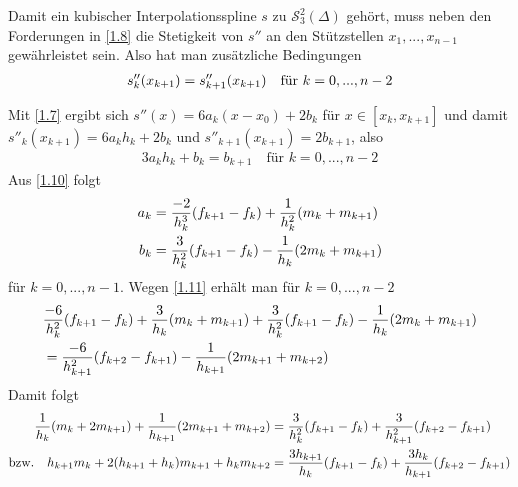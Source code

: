 Damit ein kubischer Interpolationsspline $s$ zu $\mathcal{S}^2_3(\Delta)$ gehört, muss neben den Forderungen in \cref{1.8} die Stetigkeit von $s''$ an den Stützstellen $x_1,...,x_{n-1}$ gewährleistet sein. Also hat man zusätzliche Bedingungen
\begin{align}
	s''_k(x_{k+1})=s''_{k+1}(x_{k+1})\quad\text{für } k=0,...,n-2\notag
\end{align}
\begin{center}
\end{center}
Mit \cref{1.7} ergibt sich $s''(x)=6a_k(x-x_0)+2b_k$ für $x\in[x_k,x_{k+1}]$ und damit $s''_k(x_{k+1}) = 6a_kh_k+2b_k$ und $s''_{k+1}(x_{k+1})=2b_{k+1}$, also 
\begin{align}
	\label{1.11}
	3a_kh_k+b_k=b_{k+1}\quad\text{für }k=0,...,n-2
\end{align}
Aus \cref{1.10} folgt
\begin{align}
	a_k &= \frac{-2}{h_k^3}(f_{k+1}-f_k)+\frac{1}{h_k^2}(m_k+m_{k+1}) \notag \\
	b_k &= \frac{3}{h_k^2}(f_{k+1}-f_k)-\frac{1}{h_k}(2m_k+m_{k+1})\notag
\end{align}
für $k=0,...,n-1$. Wegen \cref{1.11} erhält man für $k=0,...,n-2$
\begin{align}
	& \frac{-6}{h_k^2}(f_{k+1}-f_k) + \frac{3}{h_k}(m_k+m_{k+1}) + \frac{3}{h_k^2}(f_{k+1}-f_k) - \frac{1}{h_k}(2m_k+m_{k+1}) \notag \\
	&= \frac{-6}{h^2_{k+1}}(f_{k+2}-f_{k+1})-\frac{1}{h_{k+1}}(2m_{k+1}+m_{k+2})\notag
\end{align}
Damit folgt 
\begin{align}
	\frac{1}{h_k}(m_k+2m_{k+1}) + \frac{1}{h_{k+1}}(2m_{k+1}+m_{k+2}) &= \frac{3}{h_k^2}(f_{k+1}-f_k) + \frac{3}{h_{k+1}^2}(f_{k+2}-f_{k+1})\notag \\
	\text{bzw.}\quad h_{k+1}m_k + 2(h_{k+1}+h_k)m_{k+1}+h_km_{k+2} &= \frac{3h_{k+1}}{h_k}(f_{k+1}-f_k) + \frac{3h_k}{h_{k+1}}(f_{k+2}-f_{k+1})\notag
\end{align}
